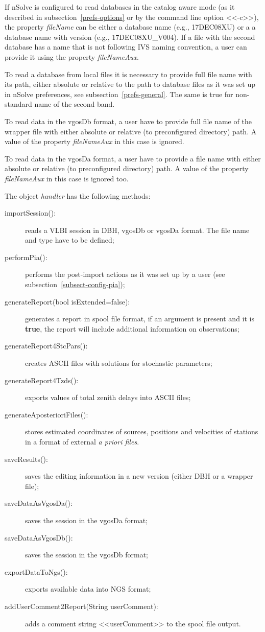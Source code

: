 \documentclass [10pt,letterpaper]{report}
\newcommand{\nuSolve}{\greektext n\latintext Solve}
\begin{document}
If \nuSolve{} is configured to read databases in the catalog aware mode
(as it described in subsection~\ref{prefs-options} or by the command line
option <<-c>>), the property {\sl fileName} can be either a database name
(e.g., 17DEC08XU) or a a database name with version (e.g.,
17DEC08XU\_V004). If a file with the second database has a name that is
not following IVS naming convention, a user can provide it using the
property {\sl fileNameAux}.

To read a database from local files it is necessary to provide full file
name with its path, either absolute or relative to the path to database
files as it was set up in \nuSolve{} preferences, see subsection~\ref{prefs-general}.
The same is true for non-standard name of the second band.

To read data in the vgosDb format, a user have to provide full file name
of the wrapper file with either absolute or relative (to preconfigured
directory) path. A value of the property {\sl fileNameAux} in this case is
ignored.

To read data in the vgosDa format, a user have to provide a file name
with either absolute or relative (to preconfigured directory) path. A
value of the property {\sl fileNameAux} in this case is ignored too.



The object {\sl handler} has the following methods:
\begin{description}
\item[importSession():]   reads a VLBI session in DBH, vgosDb or vgosDa format. The file name and type have to be defined;
\item[performPia():]      performs the post-import actions as it was set up by a user (see subsection~\ref{subsect-config-pia});
\item[generateReport(bool isExtended=false):] generates a report in spool file format, if an argument is
present and it is {\bf true}, the report will include additional information on observations;
\item[generateReport4StcPars():] creates ASCII files with solutions for stochastic parameters;
\item[generateReport4Tzds():]    exports values of total zenith delays into ASCII files;
\item[generateAposterioriFiles():] stores estimated coordinates of sources, positions and velocities
of stations in a format of external {\it a priori files}.
\item[saveResults():]     saves the editing information in a new version (either DBH or a wrapper file);
\item[saveDataAsVgosDa():] saves the session in the vgosDa format;
\item[saveDataAsVgosDb():] saves the session in the vgosDb format;
\item[exportDataToNgs():] exports available data into NGS format;
\item[addUserComment2Report(String userComment):] adds a comment string <<userComment>> to the spool file output.
\end{description}
\end{document}

